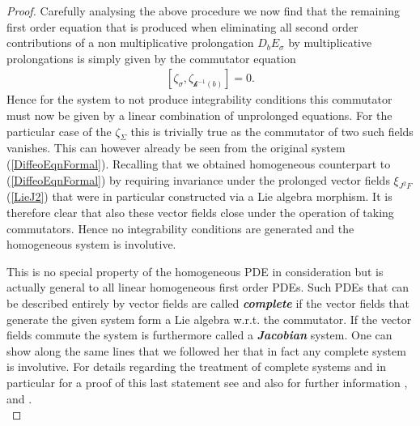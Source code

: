 \documentclass[a4paper,12pt, DIV=14, BCOR=5mm, twoside, headsepline]{scrbook}
\begin{document}
\begin{proof}
Carefully analysing the above procedure we now find that the remaining first order equation that is produced when eliminating all second order contributions of a non multiplicative prolongation $D_bE_{\sigma}$ by multiplicative prolongations is simply given by the commutator equation
\begin{align}
    \left [\zeta_{\sigma}, \zeta_{\mathcal{k}^{-1}(b)} \right] = 0.
\end{align}
Hence for the system to not produce integrability conditions this commutator must now be given by a linear combination of unprolonged equations. For the particular case of the $\zeta_{\Sigma}$ this is trivially true as the commutator of two such fields vanishes. This can however already be seen from the original system (\ref{DiffeoEqnFormal}).
Recalling that we obtained homogeneous counterpart to (\ref{DiffeoEqnFormal}) by requiring invariance under the prolonged vector fields $\xi_{J^2F}$ (\ref{LieJ2}) that were in particular constructed via a Lie algebra morphism. It is therefore clear that also these vector fields close under the operation of taking commutators. Hence no integrability conditions are generated and the homogeneous system is involutive.

This is no special property of the homogeneous PDE in consideration but is actually general to all linear homogeneous first order PDEs. Such PDEs that can be described entirely by vector fields are called \textit{\textbf{complete}} if the vector fields that generate the given system form a Lie algebra w.r.t. the commutator. If the vector fields commute the system is furthermore called a \textit{\textbf{Jacobian}} system. One can show along the same lines that we followed her that in fact any complete system is involutive. For details regarding the treatment of complete systems and in particular for a proof of this last statement see \cite{seiler1994analysis} and also for further information \cite{Clebsch1866}, \cite{caratheodory1956variationsrechnung} and \cite{lie1970theorie}.\\


\end{proof}
\end{document}
